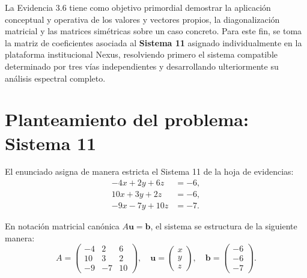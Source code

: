 \documentclass[spanish,letterpaper,oneside]{article}
\begin{document}
La Evidencia 3.6 tiene como objetivo primordial demostrar la aplicación conceptual y operativa de los valores y vectores propios, la diagonalización matricial y las matrices simétricas sobre un caso concreto. Para este fin, se toma la matriz de coeficientes asociada al \textbf{Sistema 11} asignado individualmente en la plataforma institucional Nexus, resolviendo primero el sistema compatible determinado por tres vías independientes y desarrollando ulteriormente su análisis espectral completo.

\section{Planteamiento del problema: Sistema 11}

El enunciado asigna de manera estricta el Sistema 11 de la hoja de evidencias:
\begin{equation}\label{eq:sistema11}
\begin{aligned}
-4x + 2y + 6z &= -6, \\
10x + 3y + 2z &= -6, \\
-9x - 7y + 10z &= -7.
\end{aligned}
\end{equation}

En notación matricial canónica $A\mathbf{u} = \mathbf{b}$, el sistema se estructura de la siguiente manera:
\begin{equation}
A = \begin{pmatrix} -4 & 2 & 6 \\ 10 & 3 & 2 \\ -9 & -7 & 10 \end{pmatrix}, \quad
\mathbf{u} = \begin{pmatrix} x \\ y \\ z \end{pmatrix}, \quad
\mathbf{b} = \begin{pmatrix} -6 \\ -6 \\ -7 \end{pmatrix}.
\end{equation}
\end{document}

